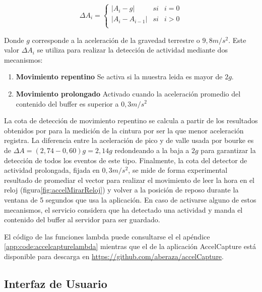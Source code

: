 \[
  \Delta A_{i}=\left\{
    \begin{array}{lcl}
      |A_i - g| & si & i = 0 \\
      |A_i - A_{i-1}| & si & i > 0 \\
    \end{array}
    \right.
\]

Donde $g$ corresponde a la aceleración de la gravedad terrestre o $9,8m/s^2$. Este valor $\Delta A_i$ se utiliza para realizar la detección de actividad mediante dos mecanismos:


\begin{enumerate}
  \item \textbf{Movimiento repentino} Se activa si la muestra leida es mayor de $2g$.
  \item \textbf{Movimiento prolongado} Activado cuando la aceleración promedio del contenido del buffer es superior a $0,3m/s^2$
\end{enumerate}

La cota de detección de movimiento repentino se calcula a partir de los resultados obtenidos por  para la medición de la cintura por ser la que menor aceleración registra. La diferencia entre la aceleración de pico y de valle usada por bourke es de $\Delta A = (2,74 - 0,60)g = 2,14g$ redondeando a la baja a $2g$ para garantizar la detección de todos los eventos de este tipo. Finalmente, la cota del detector de actividad prolongada, fijada en $0,3m/s^2$, se mide de forma experimental resultado de promediar el vector para realizar el movimiento de leer la hora en el reloj (figura\ref{fig:accelMirarReloj}) y volver a la posición de reposo durante la ventana de 5 segundos que usa la aplicación. En caso de activarse alguno de estos mecanismos, el servicio considera que ha detectado una actividad y manda el contenido del buffer al servidor para ser guardado. 


El código de las funciones lambda puede consultarse el el apéndice \ref{app:code:accelcapturelambda} mientras que el de la aplicación AccelCapture está disponible para descarga en \url{https://github.com/aberaza/accelCapture}.

\subsection{Interfaz de Usuario}

